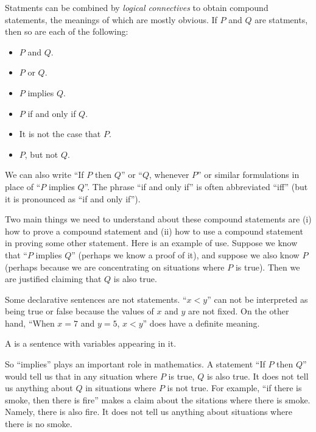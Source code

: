 Statments can be combined by \emph{logical connectives} to obtain compound statements, the meanings of which are mostly obvious. If $P$ and $Q$ are statments, then so are each of the following:
\begin{itemize}
	\item $P$ and $Q$.
	\item $P$ or $Q$.  
	\item $P$ implies $Q$.
	\item $P$ if and only if $Q$.
	\item It is not the case that $P$.
	\item $P$, but not $Q$.  
\end{itemize}
We can also write ``If $P$ then $Q$'' or ``$Q$, whenever $P$'' or similar formulations in place of ``$P$ implies $Q$''. The phrase ``if and only if'' is often abbreviated ``iff'' (but it is pronounced as ``if and only if'').

Two main things we need to understand about these compound statements are (i) how to prove a compound statement and (ii) how to use a compound statement in proving some other statement. 
Here is an example of use. 
Suppose we know that ``$P$ implies $Q$'' (perhaps we know a proof of it), and suppose we also know $P$ (perhaps because we are concentrating on situations where $P$ is true).
Then we are justified claiming that $Q$ is also true. 

Some declarative sentences are not statements. 
``$x<y$'' can not be interpreted as being true or false because the values of $x$ and $y$ are not fixed.
On the other hand, ``When $x=7$ and $y=5$, $x<y$'' does have a definite meaning.

A  is a sentence with variables appearing in it. 

 So ``implies'' plays an important role in mathematics. A statement ``If $P$ then $Q$'' would tell us that in any situation where $P$ is true, $Q$ is also true. It does not tell us anything about $Q$ in situations where $P$ is not true.
For example, ``if there is smoke, then there is fire'' makes a claim about the sitations where there is smoke. Namely, there is also fire. It does not tell us anything about situations where there is no smoke.


